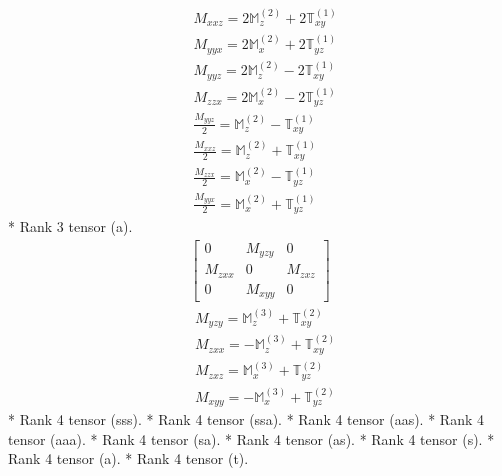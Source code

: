 \documentclass[fleqn,8pt,landscape]{jsarticle}
\begin{document}
\begin{align*}
& M_{xxz} = 2 \mathbb{M}_{z}^{(2)} + 2 \mathbb{T}_{xy}^{(1)} \\
& M_{yyx} = 2 \mathbb{M}_{x}^{(2)} + 2 \mathbb{T}_{yz}^{(1)} \\
& M_{yyz} = 2 \mathbb{M}_{z}^{(2)} - 2 \mathbb{T}_{xy}^{(1)} \\
& M_{zzx} = 2 \mathbb{M}_{x}^{(2)} - 2 \mathbb{T}_{yz}^{(1)} \\
& \frac{M_{yyz}}{2} = \mathbb{M}_{z}^{(2)} - \mathbb{T}_{xy}^{(1)} \\
& \frac{M_{xxz}}{2} = \mathbb{M}_{z}^{(2)} + \mathbb{T}_{xy}^{(1)} \\
& \frac{M_{zzx}}{2} = \mathbb{M}_{x}^{(2)} - \mathbb{T}_{yz}^{(1)} \\
& \frac{M_{yyx}}{2} = \mathbb{M}_{x}^{(2)} + \mathbb{T}_{yz}^{(1)}
\end{align*}
* Rank 3 tensor (a).
\begin{align*}
\begin{bmatrix} 0 & M_{yzy} & 0 \\ M_{zxx} & 0 & M_{zxz} \\ 0 & M_{xyy} & 0 \end{bmatrix}
\end{align*}
\begin{align*}
& M_{yzy} = \mathbb{M}_{z}^{(3)} + \mathbb{T}_{xy}^{(2)} \\
& M_{zxx} = - \mathbb{M}_{z}^{(3)} + \mathbb{T}_{xy}^{(2)} \\
& M_{zxz} = \mathbb{M}_{x}^{(3)} + \mathbb{T}_{yz}^{(2)} \\
& M_{xyy} = - \mathbb{M}_{x}^{(3)} + \mathbb{T}_{yz}^{(2)}
\end{align*}
* Rank 4 tensor (sss).
* Rank 4 tensor (ssa).
* Rank 4 tensor (aas).
* Rank 4 tensor (aaa).
* Rank 4 tensor (sa).
* Rank 4 tensor (as).
* Rank 4 tensor (s).
* Rank 4 tensor (a).
* Rank 4 tensor (t).
\end{document}
